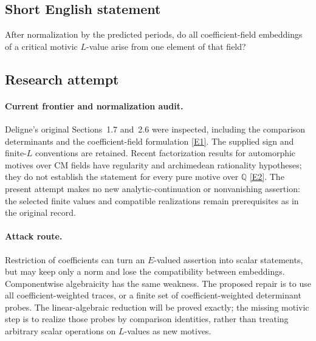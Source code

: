 \documentclass[11pt,a4paper]{article}
\numberwithin{equation}{section}
\newcommand{\Q}{\mathbb{Q}}
\newcommand{\eref}[2]{\hyperlink{extra:#1:#2}{[E#2]}}
\begin{document}
\subsection{Short English statement}
After normalization by the predicted periods, do all coefficient-field embeddings of a critical motivic $L$-value arise from one element of that field?
\subsection{Research attempt}

\paragraph{Current frontier and normalization audit.}
Deligne's original Sections~1.7 and~2.6 were inspected, including the
comparison determinants and the coefficient-field formulation
\eref{30002589}{1}. The supplied sign and finite-$L$ conventions are retained.
Recent factorization results for automorphic motives over CM fields have
regularity and archimedean rationality hypotheses; they do not establish
the statement for every pure motive over $\Q$ \eref{30002589}{2}.
The present attempt makes no new analytic-continuation or nonvanishing
assertion: the selected finite values and compatible realizations remain
prerequisites as in the original record.

\paragraph{Attack route.}
Restriction of coefficients can turn an $E$-valued assertion into scalar
statements, but may keep only a norm and lose the compatibility between
embeddings. Componentwise algebraicity has the same weakness. The proposed
repair is to use all coefficient-weighted traces, or a finite set of
coefficient-weighted determinant probes. The linear-algebraic reduction
will be proved exactly; the missing motivic step is to realize those probes
by comparison identities, rather than treating arbitrary scalar operations
on $L$-values as new motives.
\end{document}
